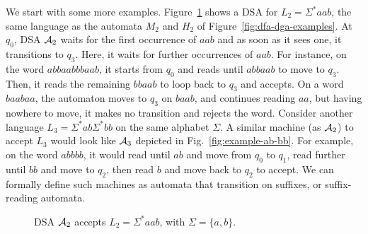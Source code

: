 We start with some more examples. Figure~\ref{fig:example-aab} shows a
DSA for $L_2 = \Sigma^* aab$, the same language as the automata $M_2$
and $H_2$ of Figure~\ref{fig:dfa-dga-examples}. At $q_0$, DSA $\mathcal{A}_2$
waits for the first occurrence of $aab$ and as soon as it sees one, it
transitions to $q_3$. Here, it waits for further occurrences of
$aab$. For instance, on the word $abbaabbbaab$, it starts from $q_0$
and reads until $abbaab$ to move to $q_3$. Then, it reads the
remaining $bbaab$ to loop back to $q_3$ and accepts. On a word
$baabaa$, the automaton moves to $q_3$ on $baab$, and continues
reading $aa$, but having nowhere to move, it makes no transition and
rejects the word. Consider another language
$L_3 = \Sigma^*ab\Sigma^*bb$ on the same alphabet $\Sigma$. A similar
machine (as $\mathcal{A}_2$) to accept $L_3$ would look like $\mathcal{A}_3$ depicted
in Fig.~\ref{fig:example-ab-bb}. For example, on the word $abbbb$, it
would read until $ab$ and move from $q_0$ to $q_1$, read further until
$bb$ and move to $q_2$, then read $b$ and move back to $q_2$ to
accept. We can formally define such machines as automata that
transition on suffixes, or suffix-reading automata.
\begin{figure}
  \centering
  \caption{DSA $\mathcal{A}_2$ accepts $L_2 = \Sigma^*aab$, with
    $\Sigma = \{a, b\}$.}
  \label{fig:example-aab}
\end{figure}





